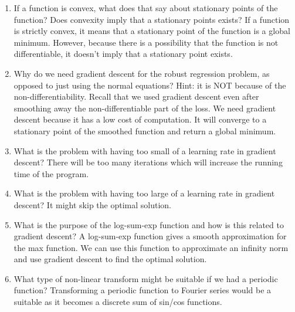 \documentclass{article}
\def\red#1{{\color{red}#1}}
\begin{document}
\begin{enumerate}
\item If a function is convex, what does that say about stationary points of the function? Does convexity imply that a stationary points exists?
\red{If a function is strictly convex, it means that a stationary point of the function is a global minimum. However, because there is a possibility that the function is not differentiable, it doesn't imply that a stationary point exists.}
\item Why do we need gradient descent for the robust regression problem, as opposed to just using the normal equations? Hint: it is NOT because of the non-differentiability. Recall that we used gradient descent even after smoothing away the non-differentiable part of the loss.
\red{We need gradient descent because it has a low cost of computation. It will converge to a stationary point of the smoothed function and return a global minimum.}
\item What is the problem with having too small of a learning rate in gradient descent?  \red{There will be too many iterations which will increase the running time of the program.}
\item What is the problem with having too large of a learning rate in gradient descent? \red{It might skip the optimal solution.}
\item What is the purpose of the log-sum-exp function and how is this related to gradient descent? \red{A log-sum-exp function gives a smooth approximation for the max function. We can use this function to approximate an infinity norm and use gradient descent to find the optimal solution.}
\item What type of non-linear transform might be suitable if we had a periodic function? \red{Transforming a periodic function to Fourier series would be a suitable as it becomes a discrete sum of sin/cos functions.}
\end{enumerate}
\end{document}
